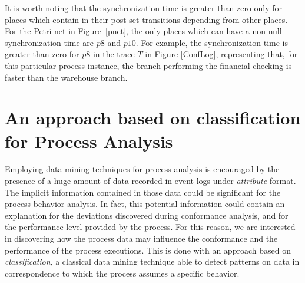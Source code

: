 \documentclass{llncs}
\begin{document}

It is worth noting that the synchronization time is greater than zero
only for places which contain in their post-set transitions depending
from other places. For the Petri net in Figure~\ref{pnet}, the only
places which can have a non-null synchronization time are $p8$ and
$p10$. For example, the synchronization time is greater than zero for
$p8$ in the trace $T$ in Figure \ref{ConfLog}, representing that, for
this particular process instance, the branch performing the financial
checking is faster than the warehouse branch.

\section{An approach based on classification for Process Analysis}\label{ClassifApproach}
Employing data mining techniques for process analysis is encouraged by the presence of a huge amount of data recorded in event logs under \emph{attribute} format. The implicit information contained in those data could be significant for the process behavior analysis. In fact, this potential information could contain an explanation for the deviations discovered during conformance analysis, and for the performance level provided by the process. For this reason, we are interested in discovering how the process data may influence the conformance and the performance of the process executions. This is done with an approach based on \emph{classification}, a classical data mining technique able to detect patterns on data in correspondence to which the process assumes a specific behavior.
\end{document}
